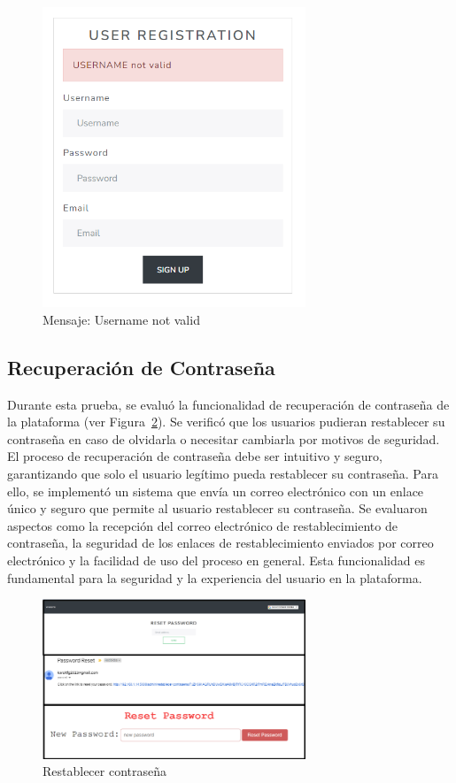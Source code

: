 \documentclass[a4paper, 12pt]{book}
\begin{document}
  \begin{figure}
    \centering
    \includegraphics[width=0.7\textwidth]{img/username.png}
    \caption{Mensaje: Username not valid}
    \label{fig:usernameerror}
  \end{figure}

\subsection{Recuperación de Contraseña}
\label{sec:recuperacion-contraseña}
Durante esta prueba, se evaluó la funcionalidad de recuperación de contraseña de la plataforma (ver Figura~\ref{fig:contrasenarest}). Se verificó que los usuarios 
pudieran restablecer su contraseña en caso de olvidarla o necesitar cambiarla por motivos de seguridad. El proceso de recuperación de contraseña debe ser intuitivo 
y seguro, garantizando que solo el usuario legítimo pueda restablecer su contraseña. Para ello, se implementó un sistema que envía un correo electrónico con un enlace 
único y seguro que permite al usuario restablecer su contraseña. Se evaluaron aspectos como la recepción del correo electrónico de restablecimiento de contraseña, 
la seguridad de los enlaces de restablecimiento enviados por correo electrónico y la facilidad de uso del proceso en general. Esta funcionalidad es fundamental 
para la seguridad y la experiencia del usuario en la plataforma.
\begin{figure}
  \centering
  \includegraphics[width=0.7\textwidth]{img/password.png}
  \caption{Restablecer contraseña}
  \label{fig:contrasenarest}
\end{figure}
\end{document}
